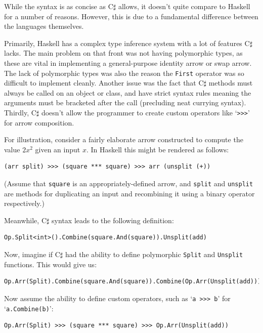 \documentclass[12pt,twoside,notitlepage]{report}
\begin{document}
While the syntax is as concise as C$\sharp$ allows, it doesn't quite compare to Haskell for a number of reasons. However, this is due to a fundamental difference between the languages themselves.

Primarily, Haskell has a complex type inference system with a lot of features C$\sharp$ lacks. The main problem on that front was not having polymorphic types, as these are vital in implementing a general-purpose identity arrow or swap arrow. The lack of polymorphic types was also the reason the \texttt{First} operator was so difficult to implement cleanly. Another issue was the fact that C$\sharp$ methods must always be called on an object or class, and have strict syntax rules meaning the arguments must be bracketed after the call (precluding neat currying syntax). Thirdly, C$\sharp$ doesn't allow the programmer to create custom operators like `\texttt{>>>}' for arrow composition.

For illustration, consider a fairly elaborate arrow constructed to compute the value $2x^2$ given an input $x$. In Haskell this might be rendered as follows:

\begin{lstlisting}
(arr split) >>> (square *** square) >>> arr (unsplit (+))
\end{lstlisting}

(Assume that \texttt{square} is an appropriately-defined arrow, and \texttt{split} and \texttt{unsplit} are methods for duplicating an input and recombining it using a binary operator respectively.)

Meanwhile, C$\sharp$ syntax leads to the following definition:

\begin{lstlisting}
Op.Split<int>().Combine(square.And(square)).Unsplit(add)
\end{lstlisting}

Now, imagine if C$\sharp$ had the ability to define polymorphic \texttt{Split} and \texttt{Unsplit} functions. This would give us:

\begin{lstlisting}
Op.Arr(Split).Combine(square.And(square)).Combine(Op.Arr(Unsplit(add)))
\end{lstlisting}

Now assume the ability to define custom operators, such as `\texttt{a >>> b}' for `\texttt{a.Combine(b)}':

\begin{lstlisting}
Op.Arr(Split) >>> (square *** square) >>> Op.Arr(Unsplit(add))
\end{lstlisting}
\end{document}
